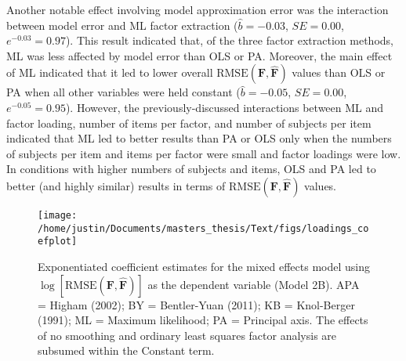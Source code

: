 \documentclass[
  english,
  man]{apa6}
\begin{document}
Another notable effect involving model approximation error was the interaction between model error and ML factor extraction (\(\hat{b} = -0.03\), \(SE = 0.00\), \(e^{-0.03} = 0.97\)). This result indicated that, of the three factor extraction methods, ML was less affected by model error than OLS or PA. Moreover, the main effect of ML indicated that it led to lower overall \(\textrm{RMSE}(\mathbf{F}, \hat{\mathbf{F}})\) values than OLS or PA when all other variables were held constant (\(\hat{b} = -0.05\), \(SE = 0.00\), \(e^{-0.05} = 0.95\)). However, the previously-discussed interactions between ML and factor loading, number of items per factor, and number of subjects per item indicated that ML led to better results than PA or OLS only when the numbers of subjects per item and items per factor were small and factor loadings were low. In conditions with higher numbers of subjects and items, OLS and PA led to better (and highly similar) results in terms of \(\textrm{RMSE}(\mathbf{F}, \hat{\mathbf{F}})\) values.

\begin{figure}

{\centering \texttt{[image: /home/justin/Documents/masters\_thesis/Text/figs/loadings\_coefplot]} 

}

\caption{Exponentiated coefficient estimates for the mixed effects model using $\log[\textrm{RMSE}(\mathbf{F}, \hat{\mathbf{F}})]$ as the dependent variable (Model 2B). APA = Higham (2002); BY = Bentler-Yuan (2011); KB = Knol-Berger (1991); ML = Maximum likelihood; PA = Principal axis. The effects of no smoothing and ordinary least squares factor analysis are subsumed within the Constant term.}\label{fig:coefplot-loading-recovery}
\end{figure}
\end{document}

